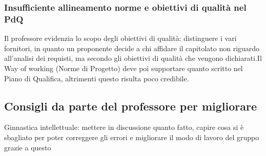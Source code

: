 \subsubsection{Insufficiente allineamento norme e obiettivi di qualità nel PdQ}
Il professore evidenzia lo scopo degli obiettivi di qualità: distinguere i vari fornitori, in quanto un proponente decide a chi affidare il capitolato non riguardo all'analisi dei requisti, ma secondo gli obiettivi di qualità che vengono dichiarati.Il Way of working (Norme di Progetto) deve poi supportare quanto scritto nel Piano di Qualifica, altrimenti questo risulta poco credibile.

\subsection{Consigli da parte del professore per migliorare}
Ginnastica intellettuale: mettere in discussione quanto fatto, capire cosa si è sbagliato per poter correggere gli errori e migliorare il modo di lavoro del gruppo grazie a questo







